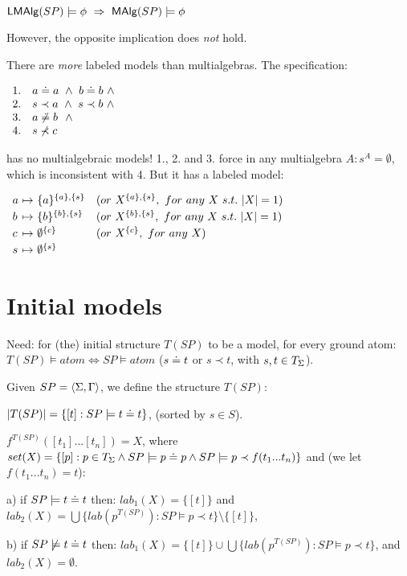 \documentclass[10pt]{article}
\begin{document}
\begin{Corollary}
$\LMS\models\phi\ \impl\ \MMS\models\phi$
\end{Corollary}
However, the opposite implication does {\em not} hold.
\begin{Example}
There are {\em more} labeled models than multialgebras. The specification:

$\begin{array}{ll}
1. & a\mathrel{\dot{=} } a\ \land\  b\mathrel{\dot{=} } b\ \land \\
2. & s\prec a\ \land\  s\prec b\ \land \\
3. & a\not\mathrel{\dot{=} } b\ \ \land \\
4. & s\not\prec c
\end{array}$

\noindent
has no multialgebraic models! 1., 2. and 3. force in any multialgebra $A:
s^A=\emptyset$, which is inconsistent with 4. But it has a labeled model:

$\begin{array}{l@{\ \mapsto\ }ll}
a & \{a\}^{\{a\},\{s\}} & (or\ X^{\{a\},\{s\}},\ for\ any\ X\ s.t.\ |X|=1) \\[.5ex]
b & \{b\}^{\{b\},\{s\}} & (or\ X^{\{b\},\{s\}},\ for\ any\ X\ s.t.\ |X|=1) \\[.5ex]
c & \emptyset^{\{c\}} & (or\ X^{\{c\}},\ for\ any\ X) \\[.5ex]
s & \emptyset^{\{s\}}
\end{array}$
\end{Example}

\section*{Initial models}
%
\begin{Claim}
Need: for (the) initial structure $T(SP)$ to be a model, for every ground
atom: $T(SP)\models atom\iff SP\models
atom$ ($s\mathrel{\dot{=} } t$ or $s\prec t$, with $s,t\in T_{\Sigma}$).
\end{Claim}
\begin{Definition}
Given $SP=\langle\Sigma,\Gamma\rangle$, we define the structure $T(SP)$:
\begin{ite}
\item $|T(SP)| = \{[t]:SP\models t\mathrel{\dot{=} } t\}$, (sorted by $s\in S$).
\item $f^{T(SP)}([t_1]...[t_n])=X$, where
$set(X) = \{ [p]: p\in T_{\Sigma}\land SP\models p\mathrel{\dot{=} }
p\land SP\models p\prec f(t_1...t_n)\}$ and (we let $f(t_1...t_n)=t$):
\begin{ite}
\item[a)] if $SP\models t\mathrel{\dot{=} } t$ then: 
$lab_1(X) = \{[t]\}$ and $lab_2(X) 
= \bigcup\{lab(p^{T(SP)}):SP\models p\prec t\}\setminus\{[t]\}$,\vspace*{.5ex}
\item[b)] if $SP\not\models t\mathrel{\dot{=} } t$ then: 
$lab_1(X) = \{[t]\}\cup \bigcup\{lab(p^{T(SP)}):SP\models p\prec
t\}$, and $lab_2(X)=\emptyset$.
\end{ite}
\end{ite}
\end{Definition}
\end{document}
